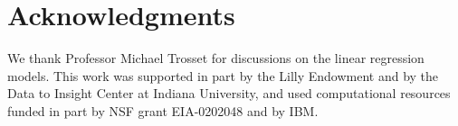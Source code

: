 \section{Acknowledgments}

We thank Professor Michael Trosset for discussions on the linear
regression models.  This work was supported in part by 
the Lilly Endowment and by the Data to Insight Center at Indiana
University, and used computational resources funded in part by
NSF grant EIA-0202048 and by IBM.

